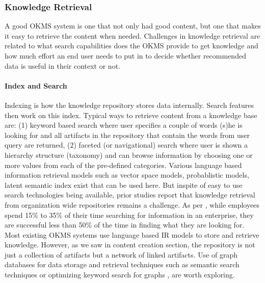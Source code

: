 
\subsubsection{Knowledge Retrieval}

A good OKMS system is one that not only had good content, but one that makes it easy to retrieve the content when needed. 
Challenges in knowledge retrieval are related to what search capabilities does the OKMS provide to get knowledge and how much effort an end user needs to put in to decide whether recommended data is useful in their context or not. 

\paragraph*{Index and Search} Indexing is how the knowledge repository stores data internally. Search features then work on this index.
Typical ways to retrieve content from a knowledge base are: (1) keyword based search where user specifies a couple of words (s)he is looking for and all artifacts in the repository that contain the words from user query are returned, (2) faceted (or navigational) search where user is shown a hierarchy structure (taxonomy) and can browse information by choosing one or more values from each of the pre-defined categories. Various language based information retrieval models \cite{manning2008introduction} such as vector space models, probablistic models, latent semantic index exist that can be used here. But inspite of easy to use search technologies being available, prior studies report that knowledge retrieval from organization wide repositories remains a challenge. As per \cite{idc,idc2}, while employees spend 15\% to 35\% of their time searching for information in an enterprise, they are successful less than 50\% of the time in finding what they are looking for. Most existing OKMS systems use language based IR models to store and retrieve knowledge. However, as we saw in content creation section, the repository is not just a collection of artifacts but a network of linked artifacts. Use of graph databases for data storage and retrieval techniques such as semantic search techniques \cite{Guha:2003} or optimizing keyword search for graphs \cite{kacholia2005bidirectional}, are worth exploring.

